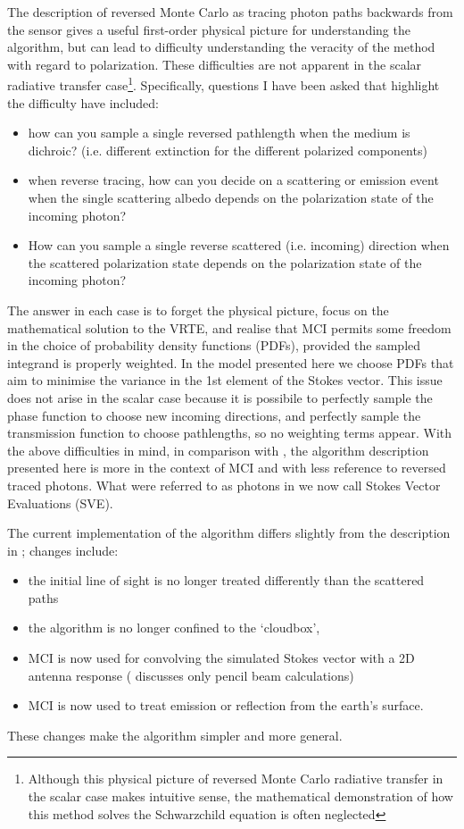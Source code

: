 The description of reversed Monte Carlo as tracing photon paths backwards from
the sensor gives a useful first-order physical picture for understanding the
algorithm, but can lead to difficulty understanding the veracity of the method
with regard to polarization.  These difficulties are not apparent in the scalar
radiative transfer case\footnote{Although this physical picture of reversed
Monte Carlo radiative transfer in the scalar case makes intuitive sense, the
mathematical demonstration of how this method solves the Schwarzchild equation
is often neglected}. Specifically, questions I have been asked that highlight
the difficulty have included:
\begin{itemize}
\item how can you sample a single reversed pathlength when the medium is
dichroic? (i.e. different extinction for the different polarized components)
\item when reverse tracing, how can you decide on a scattering or emission event
when the single scattering albedo depends on the polarization state of the
incoming photon?
\item How can you sample a single reverse scattered (i.e. incoming) direction
when the scattered polarization state depends on the polarization state of the
incoming photon?
\end{itemize}
The answer in each case is to forget the physical picture, focus on the
mathematical solution to the VRTE, and realise that MCI permits some freedom in
the choice of probability density functions (PDFs), provided the sampled
integrand is properly weighted.   In the model presented here we choose PDFs
that aim to minimise the variance in the 1st element of the Stokes vector.  This
issue does not arise in the scalar case because it is possibile to perfectly
sample the phase function to choose new incoming directions, and perfectly
sample the transmission function to choose pathlengths, so no weighting terms
appear. With the above difficulties in mind, in comparison with
\citep{davisetal:04}, the algorithm description presented here is more in the
context of MCI and with less reference to reversed traced photons.  What were
referred to as photons in \citep{davisetal:04} we now call Stokes Vector
Evaluations (SVE).

The current implementation of the algorithm differs slightly from the
description in \citep{davisetal:04}; changes include:
\begin{itemize}
\item the initial line of sight is no longer treated differently than the
scattered paths
\item the algorithm is no longer confined to the `cloudbox', 
\item MCI is now used for convolving the simulated Stokes vector with a 2D
antenna response (\citep{davisetal:04} discusses only pencil beam calculations)
\item MCI is now used to treat emission or reflection from the earth's surface.
\end{itemize}
These changes make the algorithm simpler and more general.


